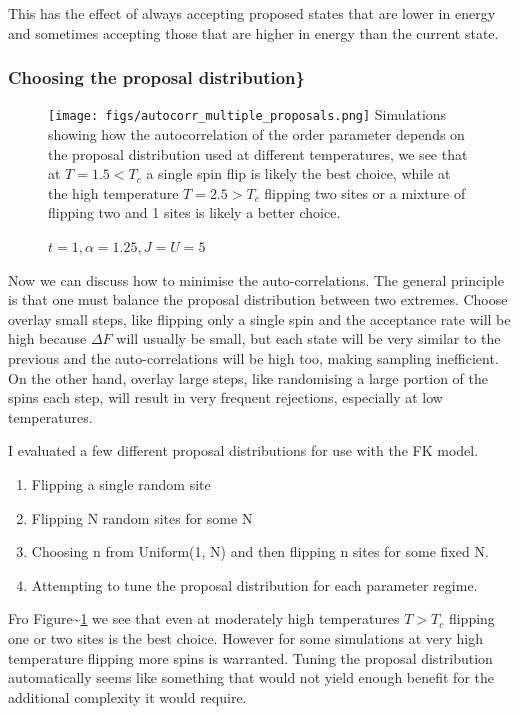 This has the effect of always accepting proposed states that are lower in energy and sometimes accepting those that are higher in energy than the current state.

\hypertarget{choosing-the-proposal-distribution}{%
\subsubsection{Choosing the proposal distribution\}}\label{choosing-the-proposal-distribution}}

\begin{figure}[H]
  \centering
  \texttt{[image: figs/autocorr\_multiple\_proposals.png]}
  Simulations showing how the autocorrelation of the order parameter depends on the proposal distribution used at different temperatures, we see that at $T = 1.5 < T_c$ a single spin flip is likely the best choice, while at the high temperature $T = 2.5 > T_c$ flipping two sites or a mixture of flipping two and 1 sites is likely a better choice. 
  \caption{ $t = 1, \alpha = 1.25, J = U = 5 $ \label{fig:comparison}}
\end{figure}

Now we can discuss how to minimise the auto-correlations. The general principle is that one must balance the proposal distribution between two extremes. Choose overlay small steps, like flipping only a single spin and the acceptance rate will be high because \(\Delta F\) will usually be small, but each state will be very similar to the previous and the auto-correlations will be high too, making sampling inefficient. On the other hand, overlay large steps, like randomising a large portion of the spins each step, will result in very frequent rejections, especially at low temperatures.

I evaluated a few different proposal distributions for use with the FK model.

\begin{enumerate}
\item Flipping a single random site
\item Flipping N random sites for some N
\item Choosing n from Uniform(1, N) and then flipping n sites for some fixed N.
\item Attempting to tune the proposal distribution for each parameter regime.
\end{enumerate}

Fro Figure\textasciitilde{}\ref{fig:comparison} we see that even at moderately high temperatures \(T > T_c\) flipping one or two sites is the best choice. However for some simulations at very high temperature flipping more spins is warranted. Tuning the proposal distribution automatically seems like something that would not yield enough benefit for the additional complexity it would require.

